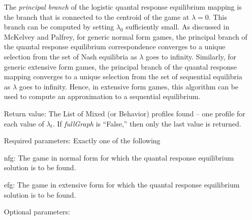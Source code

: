 \begin{itemize}
The {\em principal branch} of the logistic quantal response
equilibrium mapping is the branch that is connected to the centroid of
the game at $\lambda = 0$.  This branch can be computed by setting
$\lambda_0$ sufficiently small.  As discussed in McKelvey and Palfrey,
for generic normal form games, the principal branch of the quantal
response equilibrium correspondence converges to a unique selection
from the set of Nash equilibria as $\lambda$ goes to infinity.
Similarly, for generic extensive form games, the principal branch of
the quantal response mapping converges to a unique selection from the
set of sequential equilibria as $\lambda$ goes to infinity.  Hence, in
extensive form games, this algorithm can be used to compute an
approximation to a sequential equilibrium.
\item
[Return value:] The List of Mixed (or Behavior) profiles found -- one
profile for each value of $\lambda_t$.  If {\em fullGraph} is
``False,'' then only the last value is returned.  
\item 
[Required parameters:]\hfil\null Exactly one of the following

\bd
\item
[nfg:] The game in normal form for which the quantal response
equilibrium solution is to be
found.
\item	
[efg:] The game in extensive form for which the quantal response
equilibrium solution is to be found.
\ed

\item
[Optional parameters:]\hfil\null


\end{itemize}
